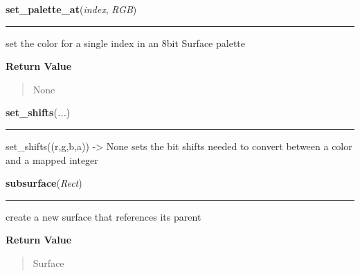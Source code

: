 \hspace{.8\funcindent}\begin{boxedminipage}{\funcwidth}

    \raggedright \textbf{set\_palette\_at}(\textit{index}, \textit{RGB})

    \vspace{-1.5ex}

    \rule{\textwidth}{0.5\fboxrule}
\setlength{\parskip}{2ex}
    set the color for a single index in an 8bit Surface palette

\setlength{\parskip}{1ex}
      \textbf{Return Value}
    \vspace{-1ex}

      \begin{quote}
      None

      \end{quote}

    \end{boxedminipage}

    \label{pygame:Surface:set_shifts}

    \vspace{0.5ex}

\hspace{.8\funcindent}\begin{boxedminipage}{\funcwidth}

    \raggedright \textbf{set\_shifts}(\textit{...})

    \vspace{-1.5ex}

    \rule{\textwidth}{0.5\fboxrule}
\setlength{\parskip}{2ex}
    set\_shifts((r,g,b,a)) -{\textgreater} None sets the bit shifts needed 
    to convert between a color and a mapped integer

\setlength{\parskip}{1ex}
    \end{boxedminipage}

    \label{pygame:Surface:subsurface}

    \vspace{0.5ex}

\hspace{.8\funcindent}\begin{boxedminipage}{\funcwidth}

    \raggedright \textbf{subsurface}(\textit{Rect})

    \vspace{-1.5ex}

    \rule{\textwidth}{0.5\fboxrule}
\setlength{\parskip}{2ex}
    create a new surface that references its parent

\setlength{\parskip}{1ex}
      \textbf{Return Value}
    \vspace{-1ex}

      \begin{quote}
      Surface

      \end{quote}

    \end{boxedminipage}

